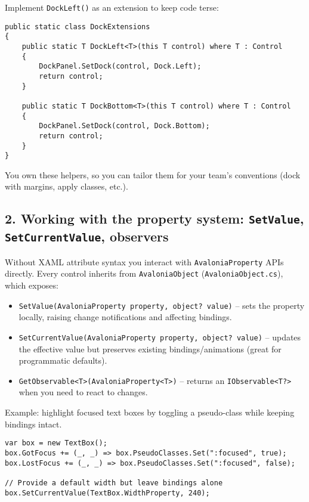 Implement \passthrough{\lstinline!DockLeft()!} as an extension to keep
code terse:

\begin{lstlisting}
public static class DockExtensions
{
    public static T DockLeft<T>(this T control) where T : Control
    {
        DockPanel.SetDock(control, Dock.Left);
        return control;
    }

    public static T DockBottom<T>(this T control) where T : Control
    {
        DockPanel.SetDock(control, Dock.Bottom);
        return control;
    }
}
\end{lstlisting}

You own these helpers, so you can tailor them for your team's
conventions (dock with margins, apply classes, etc.).

\subsection{\texorpdfstring{2. Working with the property system:
\texttt{SetValue}, \texttt{SetCurrentValue},
observers}{2. Working with the property system: SetValue, SetCurrentValue, observers}}\label{working-with-the-property-system-setvalue-setcurrentvalue-observers}

Without XAML attribute syntax you interact with
\passthrough{\lstinline!AvaloniaProperty!} APIs directly. Every control
inherits from \passthrough{\lstinline!AvaloniaObject!}
(\passthrough{\lstinline!AvaloniaObject.cs!}), which exposes:

\begin{itemize}
\tightlist
\item
  \passthrough{\lstinline!SetValue(AvaloniaProperty property, object? value)!}
  -- sets the property locally, raising change notifications and
  affecting bindings.
\item
  \passthrough{\lstinline!SetCurrentValue(AvaloniaProperty property, object? value)!}
  -- updates the effective value but preserves existing
  bindings/animations (great for programmatic defaults).
\item
  \passthrough{\lstinline!GetObservable<T>(AvaloniaProperty<T>)!} --
  returns an \passthrough{\lstinline!IObservable<T?>!} when you need to
  react to changes.
\end{itemize}

Example: highlight focused text boxes by toggling a pseudo-class while
keeping bindings intact.

\begin{lstlisting}
var box = new TextBox();
box.GotFocus += (_, _) => box.PseudoClasses.Set(":focused", true);
box.LostFocus += (_, _) => box.PseudoClasses.Set(":focused", false);

// Provide a default width but leave bindings alone
box.SetCurrentValue(TextBox.WidthProperty, 240);
\end{lstlisting}

